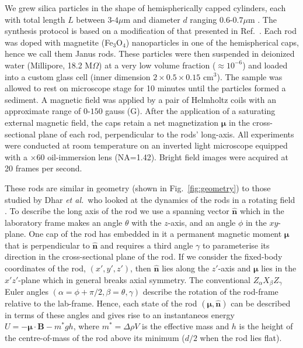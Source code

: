 \documentclass[aps,prl,reprint,twocolumn,superscriptaddress,showpacs]{revtex4-1}
\newcommand{\vcrm}[1]{\mathbf{#1}}
\newcommand{\hvcrm}[1]{\mathbf{\hat{#1}}}
\newcommand{\vc}[1]{\boldsymbol{#1}}
\newcommand{\vm}{\vc{\mu}}
\newcommand{\vn}{\hvcrm{n}}
\begin{document}
%
%
%
%
%
%
%
We grew silica particles in the shape of hemispherically capped cylinders, each with total length $L$ between $3$-$4  \mu$m and diameter $d$ ranging $0.6$-$0.7 \mu$m \cite{Gao15}. The synthesis protocol is based on a modification of that presented in Ref.\ \cite{Kuijk2011}. Each rod was doped with magnetite (Fe$_3$O$_4$) nanoparticles in one of the hemispherical caps, hence we call them Janus rods. These particles were then suspended in deionized water (Millipore, 18.2 M$\Omega$) at a very low volume fraction ($\approx 10^{-6}$) and loaded into a custom glass cell (inner dimension $2\times0.5\times0.15$ cm$^3$). The sample was allowed to rest on microscope stage for 10 minutes until the particles formed a sediment. A magnetic field was applied by a pair of Helmholtz coils with an approximate range of $0$-$150$ gauss (G). After the application of a saturating external magnetic field, the caps retain a net magnetization $\vc{\mu}$ in the cross-sectional plane of each rod, perpendicular to the rods' long-axis. All experiments were conducted at room temperature on an inverted light microscope equipped with a $\times60$ oil-immersion lens (NA=1.42). Bright field images were acquired at 20 frames per second.

These rods are similar in geometry (shown in Fig.\ \ref{fig:geometry}) to those studied by Dhar \emph{et al.}\ who looked at the dynamics of the rods in a rotating field \cite{Dhar2007}. To describe the long axis of the rod we use a spanning vector $\hvcrm{n}$ which in the laboratory frame makes an angle $\theta$ with the $z$-axis, and an angle $\phi$ in the $xy$-plane. One cap of the rod has embedded in it a permanent magnetic moment $\vc{\mu}$ that is perpendicular to $\hvcrm{n}$ and requires a third angle $\gamma$ to parameterise its direction in the cross-sectional plane of the rod. If we consider the fixed-body coordinates of the rod, $(x',y',z')$, then $\hvcrm{n}$ lies along the $z'$-axis and $\vc{\mu}$ lies in the $x'z'$-plane which in general breaks axial symmetry. The conventional $Z_\alpha X_\beta Z_\gamma$ Euler angles $(\alpha=\phi+\pi/2, \beta=\theta, \gamma)$ describe the rotation of the rod-frame relative to the lab-frame. Hence, each state of the rod $(\vm,\vn)$ can be described in terms of these angles and gives rise to an instantaneos energy $U=-\vc{\mu}\cdot\vcrm{B} - m^*gh$, where $m^*=\Delta\rho V$ is the effective mass and $h$ is the height of the centre-of-mass of the rod above its minimum ($d/2$ when the rod lies flat).
\end{document}

